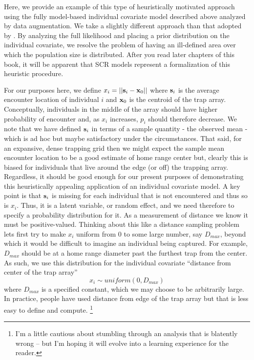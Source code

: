 Here, we provide an example of this type of heuristically motivated
approach using the fully model-based individual covariate model
described above analyzed by data augmentation. We take a slightly
different approach than that adopted by
\citet{boulanger_mclellan:2001}. By analyzing the full likelihood and
placing a prior distribution on the individual covariate, we resolve
the problem of having an ill-defined area over which the population
size is distributed. After you read later chapters of this book, it
will be apparent that SCR models represent a formalization of this
heuristic procedure.

For our purposes here, we define $x_{i} = ||{\bf s}_{i} - {\bf
  x}_{0}||$ where ${\bf s}_{i}$
is the average encounter location of individual $i$ and ${\bf x}_{0}$ is the
centroid of the trap array.  Conceptually, individuals in the middle
of the array should have higher probability of encounter and, as
$x_{i}$ increases, $p_{i}$ should therefore decrease. We note that we
have defined ${\bf s}_{i}$ in terms of a sample quantity - the observed mean
- which is ad hoc but maybe satisfactory under the circumstances. That
said, for
an expansive, dense trapping grid then we might expect the sample mean
encounter location to be a good estimate of home range center but,
clearly this is biased for individuals that live around the edge (or
off) the trapping array. Regardless, it should be good enough for our
present purposes of demonstrating this heuristically appealing
application of an individual covariate model. A key point is that
${\bf s}_{i}$ is missing for each individual that is not encountered and
thus so is $x_{i}$. Thus,
it is a latent variable, or random effect, and we need therefore to
specify a probability distribution for it.
As a measurement of distance we know it must be
positive-valued. Thinking about this like a distance sampling problem
lets first try to make $x_{i}$ uniform from $0$ to some large number,
say $D_{max}$, beyond which it would be difficult to imagine an
individual being captured. For example, $D_{max}$ should be at a home
range diameter past the furthest trap from the center.
As such, we use this distribution for the individual covariate
``distance from center of the trap array''
\[
 x_{i} \sim uniform(0,D_{max})
\]
where $D_{max}$ is a specified constant, which we may choose to be
arbitrarily large.  In practice, people have
used distance from edge of the trap array but that is less easy to
define and compute.
\footnote{I'm a little cautious about stumbling through an analysis
  that is blatently wrong -- but I'm hoping it will evolve into a
  learning experience for the reader.}


